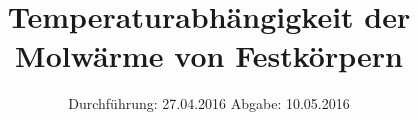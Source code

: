 


\subject{Versuchsprotokoll}
\title{Temperaturabhängigkeit der Molwärme von Festkörpern}
\date{
  Durchführung: 27.04.2016
  \hspace{3em}
  Abgabe: 10.05.2016
}




\maketitle
\thispagestyle{empty}







\printbibliography


